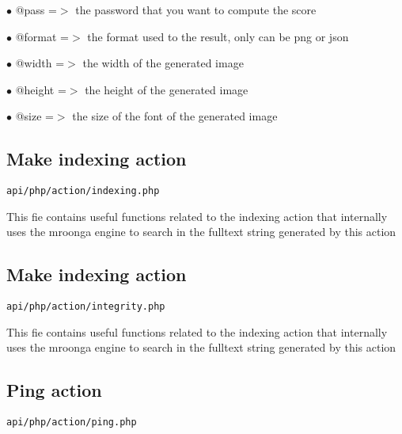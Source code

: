 \documentclass[a4paper]{article}
\begin{document}
\begin{compactitem}
\item[\color{myblue}$\bullet$] @pass   =$>$ the password that you want to compute the score
\item[\color{myblue}$\bullet$] @format =$>$ the format used to the result, only can be png or json
\end{compactitem}

\begin{compactitem}
\item[\color{myblue}$\bullet$] @width  =$>$ the width of the generated image
\item[\color{myblue}$\bullet$] @height =$>$ the height of the generated image
\item[\color{myblue}$\bullet$] @size   =$>$ the size of the font of the generated image
\end{compactitem}

\hypertarget{toc8}{}
\subsection{Make indexing action}

\begin{lstlisting}
api/php/action/indexing.php
\end{lstlisting}

This fie contains useful functions related to the indexing action that internally uses the
mroonga engine to search in the fulltext string generated by this action

\hypertarget{toc9}{}
\subsection{Make indexing action}

\begin{lstlisting}
api/php/action/integrity.php
\end{lstlisting}

This fie contains useful functions related to the indexing action that internally uses the
mroonga engine to search in the fulltext string generated by this action

\hypertarget{toc10}{}
\subsection{Ping action}

\begin{lstlisting}
api/php/action/ping.php
\end{lstlisting}
\end{document}
